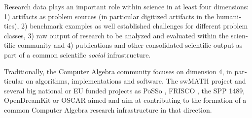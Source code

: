 \documentclass[11pt]{article}
\begin{document}
\begin{otherlanguage}{english}
\begin{multicols}{2}

Research data plays an important role within science in at least four
dimensions: 1) artifacts as problem sources (in particular digitized artifacts
in the humanities), 2) benchmark examples as well established challenges for
different problem classes, 3) raw output of research to be analyzed and
evaluated within the scientific community and 4) publications and other
consolidated scientific output as part of a common scientific \emph{social}
infrastructure.

Traditionally, the Computer Algebra community focuses on dimension 4, in
particular on algorithms, implementations and software.  The swMATH project
\cite{swmath} and several big national or EU funded projects as PoSSo
\cite{PoSSo}, FRISCO \cite{FRISCO}, the SPP 1489, OpenDreamKit \cite{odk} or
OSCAR \cite{oscar} aimed and aim at contributing to the formation of a common
Computer Algebra research infrastructure in that direction.


\end{multicols}
\end{otherlanguage}
\end{document}
